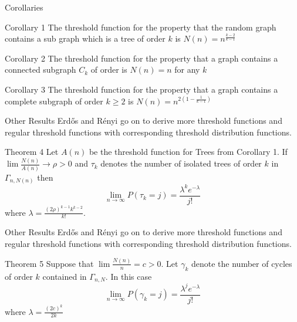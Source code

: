 \documentclass{beamer}
\begin{document}
\begin{frame}{Corollaries}
	\begin{block}{Corollary 1}
		The threshold function for the property that the random graph contains a sub graph which is a tree of order $k$ is $N(n)=n^\frac{k-2}{k-1}$
	\end{block}
	\begin{block}{Corollary 2}
		The threshold function for the property that a graph contains a connected subgraph $C_k$ of order is  $N(n)=n$ for any $k$
	\end{block}
	\begin{block}{Corollary 3}
		The threshold function for the property that a graph contains a complete subgraph of order $k\geq 2$ is $N(n)=n^{2(1-\frac{1}{k-1})}$
	\end{block}
\end{frame}

\begin{frame}{Other Results}
	Erd\H{o}s and R\'enyi go on to derive more threshold functions and regular threshold functions with corresponding threshold distribution functions. 
	
	\begin{block}{Theorem 4}
		Let $A(n)$ be the threshold function for Trees from Corollary 1. If $\lim \frac{N(n)}{A(n)}\rightarrow \rho>0$ and $\tau_k$ denotes the number of isolated trees of order $k$ in $\Gamma_{n,N(n)}$ then 
		$$\lim_{n\rightarrow \infty}P(\tau_k=j)=\frac{\lambda ^ke^{-\lambda}}{j!}$$ where $\lambda = \frac{(2\rho)^{k-1}k^{k-2}}{k!}$. 
	\end{block}
\end{frame}

\begin{frame}{Other Results}
	Erd\H{o}s and R\'enyi go on to derive more threshold functions and regular threshold functions with corresponding threshold distribution functions. 
	
	\begin{block}{Theorem 5}
		Suppose that $\lim\frac{N(n)}{n}=c>0$. Let $\gamma_k$ denote the number of cycles of order $k$ contained in $\Gamma_{n,N}$. In this case 
		$$\lim_{n\rightarrow \infty}P(\gamma_k=j)=\frac{\lambda^je^{-\lambda}}{j!}$$ where $\lambda = \frac{(2c)^k}{2k}$ 
	\end{block}
\end{frame}
\end{document}
